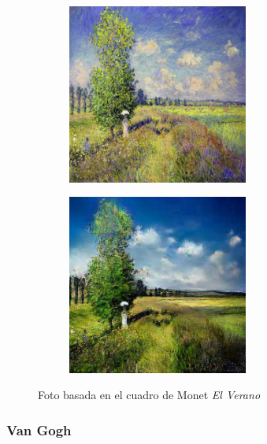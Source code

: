 \documentclass[[../main.tex]{subfiles}
\begin{document}
        \begin{figure}[!htb]
            \begin{subfigure}[b]{0.49\textwidth}
            \includegraphics[width=0.65\textwidth]{imagenes/cuadro2imagen/monet/01010.jpg}
            \end{subfigure}
        \hfill
            \begin{subfigure}[b]{0.49\textwidth}
            \includegraphics[width=0.65\textwidth]{imagenes/cuadro2imagen/monet/01010_2.jpg}
            \end{subfigure}
        \caption{Foto basada en el cuadro de Monet \textit{El Verano}}
        \label{fig:monet_foto_verano}
        \end{figure}


\newpage

\subsubsection{Van Gogh}
\end{document}
